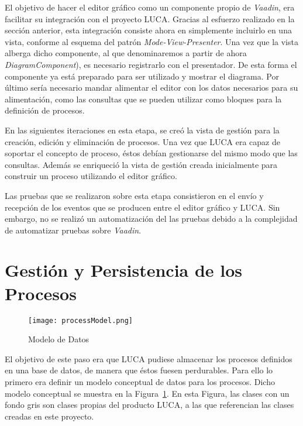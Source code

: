 El objetivo de hacer el editor gráfico como un componente propio de \emph{Vaadin}, era facilitar su integración con el proyecto LUCA. Gracias al esfuerzo realizado en la sección anterior, esta integración consiste ahora en simplemente incluirlo en una vista, conforme al esquema del patrón \emph{Mode-View-Presenter}. Una vez que la vista alberga dicho componente, al que denominaremos a partir de ahora  \emph{DiagramComponent}), es necesario registrarlo con el presentador. De esta forma el componente ya está preparado para ser utilizado y mostrar el diagrama. Por último sería necesario mandar alimentar el editor con los datos necesarios para su alimentación, como las consultas que se pueden utilizar como bloques para la definición de procesos.


En las siguientes iteraciones en esta etapa, se creó la vista de gestión para la creación, edición y eliminación de procesos. Una vez que LUCA era capaz de soportar el concepto de proceso, éstos debían gestionarse del mismo modo que las consultas. Además se enriqueció la vista de gestión creada inicialmente para construir un proceso utilizando el editor gráfico.

Las pruebas que se realizaron sobre esta etapa consistieron en el envío y recepción de los eventos que se producen entre el editor gráfico y LUCA. Sin embargo, no se realizó un automatización del las pruebas debido a la complejidad de automatizar pruebas sobre \emph{Vaadin}.

\section{Gestión y Persistencia de los Procesos}

\begin{figure}[H]
	\centering
	\texttt{[image: processModel.png]}
	\caption{Modelo de Datos}
	\label{fig:processModel}
\end{figure}

El objetivo de este paso era que LUCA pudiese almacenar los procesos definidos en una base de datos, de manera que éstos fuesen perdurables. Para ello lo primero era definir un modelo conceptual de datos para los procesos. Dicho modelo conceptual se muestra en la Figura~\ref{fig:processModel}. En esta Figura, las clases con un fondo gris son clases propias del producto LUCA, a las que referencian las clases creadas  en este proyecto.

